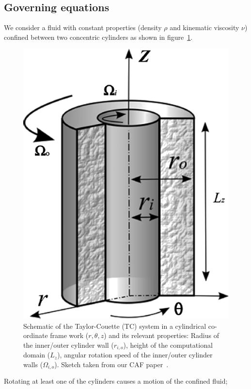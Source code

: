 \documentclass[a4paper, 11pt, DIV=11]{scrartcl}
\begin{document}
\subsection{Governing equations}
\label{subsec:gov_eq_TC}
We consider a fluid with constant properties (density $\rho$ and kinematic
viscosity $\nu$) confined between two concentric cylinders as shown in
figure~\ref{fig:tc}.
\begin{figure}
\includegraphics[width=1.00\linewidth]{figures/taylorCouette.png}
\caption{Schematic of the Taylor-Couette (TC) system in a cylindrical
co-ordinate frame work ($r, \theta, z$) and its relevant properties:
Radius of the inner/outer cylinder wall ($r_{i,o}$), height of the
computational domain ($L_z$), angular rotation speed of the inner/outer
cylinder walls ($\Omega_{i,o}$). Sketch taken from our CAF paper~\cite{Shi2015}.
}
\label{fig:tc}
\end{figure}
Rotating at least one of the cylinders causes a motion of the confined fluid;
\end{document}
